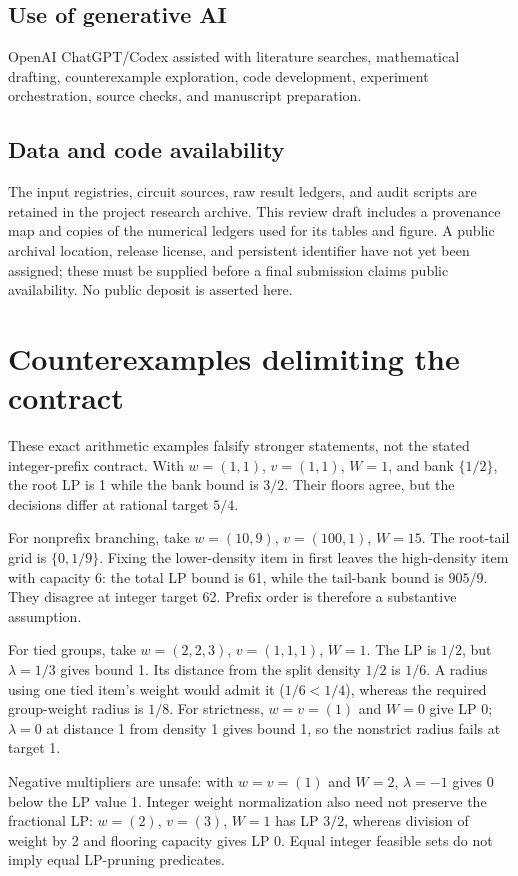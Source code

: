\documentclass[referee,pdflatex,sn-mathphys-num]{sn-jnl}
\theoremstyle{thmstyleone}
\theoremstyle{thmstyletwo}
\begin{document}
\subsection*{Use of generative AI}
OpenAI ChatGPT/Codex assisted with literature searches, mathematical drafting, counterexample exploration, code development, experiment orchestration, source checks, and manuscript preparation.
\subsection*{Data and code availability}
The input registries, circuit sources, raw result ledgers, and audit scripts are retained in the project research archive. This review draft includes a provenance map and copies of the numerical ledgers used for its tables and figure. A public archival location, release license, and persistent identifier have not yet been assigned; these must be supplied before a final submission claims public availability. No public deposit is asserted here.

\appendix
\section{Counterexamples delimiting the contract}\label{app:counterexamples}
These exact arithmetic examples falsify stronger statements, not the stated integer-prefix contract. With $w=(1,1)$, $v=(1,1)$, $W=1$, and bank $\{1/2\}$, the root LP is 1 while the bank bound is $3/2$. Their floors agree, but the decisions differ at rational target $5/4$.

For nonprefix branching, take $w=(10,9)$, $v=(100,1)$, $W=15$. The root-tail grid is $\{0,1/9\}$. Fixing the lower-density item in first leaves the high-density item with capacity 6: the total LP bound is 61, while the tail-bank bound is $905/9$. They disagree at integer target 62. Prefix order is therefore a substantive assumption.

For tied groups, take $w=(2,2,3)$, $v=(1,1,1)$, $W=1$. The LP is $1/2$, but $\lambda=1/3$ gives bound 1. Its distance from the split density $1/2$ is $1/6$. A radius using one tied item's weight would admit it ($1/6<1/4$), whereas the required group-weight radius is $1/8$. For strictness, $w=v=(1)$ and $W=0$ give LP 0; $\lambda=0$ at distance 1 from density 1 gives bound 1, so the nonstrict radius fails at target 1.

Negative multipliers are unsafe: with $w=v=(1)$ and $W=2$, $\lambda=-1$ gives 0 below the LP value 1. Integer weight normalization also need not preserve the fractional LP: $w=(2)$, $v=(3)$, $W=1$ has LP $3/2$, whereas division of weight by 2 and flooring capacity gives LP 0. Equal integer feasible sets do not imply equal LP-pruning predicates.
\end{document}

